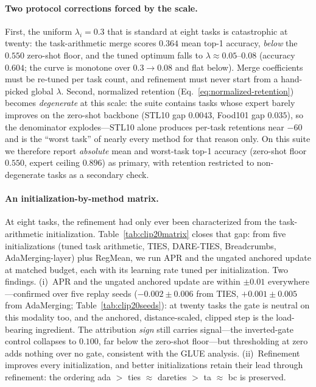 \documentclass[11pt]{article}
\begin{document}
\paragraph{Two protocol corrections forced by the scale.}
First, the uniform $\lambda_i=0.3$ that is standard at eight tasks is catastrophic at twenty: the task-arithmetic merge scores $0.364$ mean top-1 accuracy, \emph{below} the $0.550$ zero-shot floor, and the tuned optimum falls to $\lambda\approx0.05$--$0.08$ (accuracy $0.604$; the curve is monotone over $0.3\to0.08$ and flat below). Merge coefficients must be re-tuned per task count, and refinement must never start from a hand-picked global $\lambda$. Second, normalized retention (Eq.~\eqref{eq:normalized-retention}) becomes \emph{degenerate} at this scale: the suite contains tasks whose expert barely improves on the zero-shot backbone (STL10 gap $0.0043$, Food101 gap $0.035$), so the denominator explodes---STL10 alone produces per-task retentions near $-60$ and is the ``worst task'' of nearly every method for that reason only. On this suite we therefore report \emph{absolute} mean and worst-task top-1 accuracy (zero-shot floor $0.550$, expert ceiling $0.896$) as primary, with retention restricted to non-degenerate tasks as a secondary check.

\paragraph{An initialization-by-method matrix.}
At eight tasks, the refinement had only ever been characterized from the task-arithmetic initialization. Table~\ref{tab:clip20matrix} closes that gap: from five initializations (tuned task arithmetic, TIES, DARE-TIES, Breadcrumbs, AdaMerging-layer) plus RegMean, we run APR and the ungated anchored update at matched budget, each with its learning rate tuned per initialization. Two findings. (i)~APR and the ungated anchored update are within $\pm 0.01$ everywhere---confirmed over five replay seeds ($-0.002\pm0.006$ from TIES, $+0.001\pm0.005$ from AdaMerging; Table~\ref{tab:clip20seeds}): at twenty tasks the gate is neutral on this modality too, and the anchored, distance-scaled, clipped step is the load-bearing ingredient. The attribution \emph{sign} still carries signal---the inverted-gate control collapses to $0.100$, far below the zero-shot floor---but thresholding at zero adds nothing over no gate, consistent with the GLUE analysis. (ii)~Refinement improves every initialization, and better initializations retain their lead through refinement: the ordering ada $>$ ties $\approx$ dareties $>$ ta $\approx$ bc is preserved.
\end{document}
